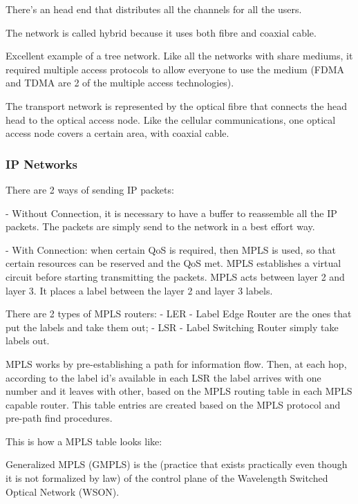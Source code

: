There's an head end that distributes all the channels for all the users. 

The network is called hybrid because it uses both fibre and coaxial cable.


Excellent example of a tree network. Like all the networks with share mediums, it required multiple access protocols to allow everyone to use the medium (FDMA and TDMA are 2 of the multiple access technologies).



The transport network is represented by the optical fibre that connects the head head to the optical access node. Like the cellular communications, one optical access node covers a certain area, with coaxial cable.


\subsubsection*{IP Networks}

There are 2 ways of sending IP packets:

- Without Connection, it is necessary to have a buffer to reassemble all the IP packets. The packets are simply send to the network in a best effort way.

- With Connection: when certain QoS is required, then MPLS is used, so that certain resources can be reserved and the QoS met.
MPLS establishes a virtual circuit before starting transmitting the packets.
MPLS acts between layer 2 and layer 3. It places a label between the layer 2 and layer 3 labels.

There are 2 types of MPLS routers:
- LER - Label Edge Router are the ones that put the labels and take them out;
- LSR - Label Switching Router simply take labels out.

MPLS works by pre-establishing a path for information flow. Then, at each hop, according to the label id's available in each LSR the label arrives with one number and it leaves with other, based on the MPLS routing table in each MPLS capable router. This table entries are created based on the MPLS protocol and pre-path find procedures.


This is how a MPLS table looks like: 





Generalized MPLS (GMPLS) is the  (practice that exists practically even though it is not formalized by law) of the control plane of the Wavelength Switched Optical Network (WSON).

